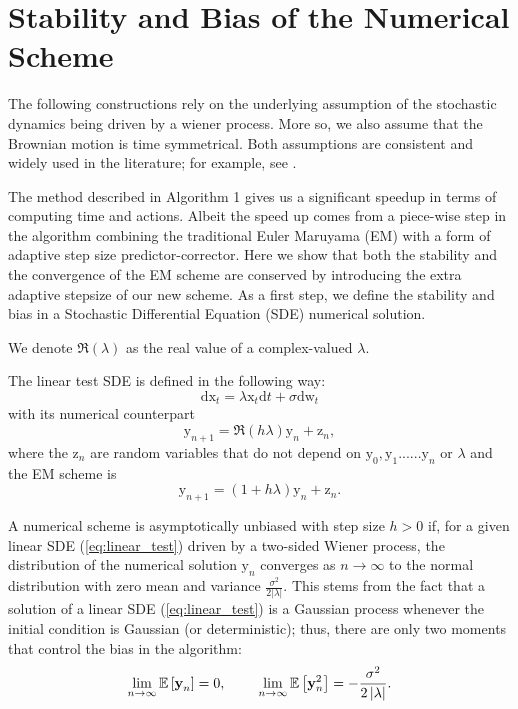 \documentclass{article}
\newcommand{\x}{\boldsymbol{\mathrm{x}}}
\newcommand{\y}{\boldsymbol{\mathrm{y}}}
\newcommand{\z}{\boldsymbol{\mathrm{z}}}
\newcommand{\w}{\boldsymbol{\mathrm{w}}}
\newcommand{\dr}{\mathrm{d}}
\begin{document}
\section{Stability and Bias of the Numerical Scheme}\label{sec:stability}
The following constructions rely on the underlying
assumption of the stochastic dynamics being driven by a wiener process.
More so, we also assume that the Brownian motion is
time symmetrical. Both assumptions are consistent and widely used
in the literature; for example, see \citep{gardiner2009stochastic}
\citep{arnold1974stochastic}.

The method described in Algorithm 1 gives us a significant speedup
in terms of computing time and actions. Albeit the speed up comes from
a piece-wise step in the algorithm combining the traditional Euler
Maruyama (EM) with a form of adaptive step size predictor-corrector.
Here we show that both the stability and the convergence of the EM
scheme are conserved by introducing the extra adaptive stepsize
of our new scheme. As a first step, we define the stability and bias
in a Stochastic Differential Equation (SDE) numerical solution. 

We denote $\Re(\lambda)$ as the real value of a complex-valued $\lambda$.

The linear test SDE is defined in the following way:
\begin{equation}
\dr\x_{t}=\lambda \x_{t}\dr t+\sigma \dr \w_{t}\label{eq:linear_test}
\end{equation}
with its numerical counterpart 
\[
\y_{n+1}=\Re\left(h\lambda\right)\y_{n}+\z_{n},
\]
 where the $\z_{n}$ are random variables that do not depend on $\y_{0},\y_{1}......\y_{n}$
or $\lambda$ and the EM scheme is 
\[
\y_{n+1}=\left(1+h\lambda\right)\y_{n}+\z_{n}.
\]

A numerical scheme is asymptotically unbiased with step size $h>0$
if, for a given linear SDE (\ref{eq:linear_test}) driven by a two-sided
Wiener process, the distribution of the numerical solution $\y_{n}$
converges as $n\rightarrow\infty$ to the normal distribution with
zero mean and variance $\frac{\sigma^{2}}{2\left|\lambda\right|}$\citep{artemiev2011numerical}.
This stems from the fact that a solution of a linear SDE (\ref{eq:linear_test})
is a Gaussian process whenever the initial condition is Gaussian (or
deterministic); thus, there are only two moments that control the
bias in the algorithm: 
\[
\lim_{n\rightarrow\infty}\mathbb{E}\left[\y_{n}\right]=0,
\hspace{0.8cm}\lim_{n\rightarrow\infty}\mathbb{E}\left[\y_{n}^{2}\right]=-\frac{\sigma^{2}}{2\left|\lambda\right|}.
\]
\end{document}
